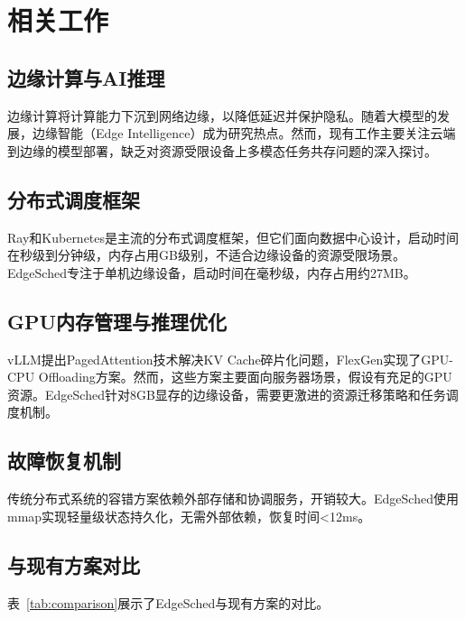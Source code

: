 \section{相关工作}

\subsection{边缘计算与AI推理}

边缘计算将计算能力下沉到网络边缘，以降低延迟并保护隐私\cite{shi2016edge}。随着大模型的发展，边缘智能（Edge Intelligence）成为研究热点\cite{zhou2019edge}。然而，现有工作主要关注云端到边缘的模型部署，缺乏对资源受限设备上多模态任务共存问题的深入探讨。

\subsection{分布式调度框架}

Ray\cite{moritz2018ray}和Kubernetes\cite{verma2015borg}是主流的分布式调度框架，但它们面向数据中心设计，启动时间在秒级到分钟级，内存占用GB级别，不适合边缘设备的资源受限场景。EdgeSched专注于单机边缘设备，启动时间在毫秒级，内存占用约27MB。

\subsection{GPU内存管理与推理优化}

vLLM\cite{kwon2023vllm}提出PagedAttention技术解决KV Cache碎片化问题，FlexGen\cite{sheng2023flexgen}实现了GPU-CPU Offloading方案。然而，这些方案主要面向服务器场景，假设有充足的GPU资源。EdgeSched针对8GB显存的边缘设备，需要更激进的资源迁移策略和任务调度机制。

\subsection{故障恢复机制}

传统分布式系统的容错方案\cite{cully2008remus}依赖外部存储和协调服务，开销较大。EdgeSched使用mmap实现轻量级状态持久化，无需外部依赖，恢复时间<12ms。

\subsection{与现有方案对比}

表~\ref{tab:comparison}展示了EdgeSched与现有方案的对比。

